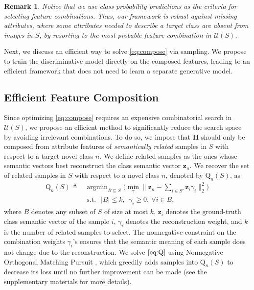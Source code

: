 \documentclass[10pt,journal,compsoc]{IEEEtran}
\newcommand{\z}{\boldsymbol{z}}
\renewcommand{\H}{\boldsymbol{H}}
\newcommand{\1}{\boldsymbol{1}}
\newcommand{\0}{\boldsymbol{0}}
\newcommand{\U}{\mathcal{U}}
\newcommand{\Q}{\mathrm{Q}}
\newcommand{\argmin}{\operatorname{argmin}}
\newcommand{\<}{\langle}
\renewcommand{\>}{\rangle}
\newtheorem{remark}{Remark}
\begin{document}
\begin{remark}
Notice that we use class probability predictions as the criteria for selecting feature combinations. Thus, our framework is robust against missing attributes, where some attributes needed to describe a target class are absent from images in $S$, by resorting to the most probable feature combination  in $\U(S)$.
\end{remark} 

Next, we discuss an efficient way to solve \eqref{eq:compose} via sampling. We propose to train the discriminative model directly on the composed features, leading to an efficient framework that does not need to learn a separate generative model.

\subsection{Efficient Feature Composition}
Since optimizing \eqref{eq:compose} requires an expensive combinatorial search in $\U(S)$, we propose an efficient method to significantly reduce the search space by avoiding irrelevant combinations. To do so, we impose that $\H$ should only be composed from attribute features of \emph{semantically related} samples in $S$ with respect to a target novel class $n$. We define related samples as the ones whose semantic vectors best reconstruct the class semantic vector $\z_n$. We recover the set of related samples in $S$ with respect to a novel class $n$, denoted by $\Q_{n}(S)$, as
\begin{equation}
\begin{split}
\label{eq:Q}
\Q_{n}(S)\triangleq &\argmin_{B\subseteq S} \Big(\min_{\gamma}\|\z_n-\sum_{i\in S'}\z_{i}\gamma_i\|^2_2\Big)\\
&\operatorname{s.t.}~~ |B|\leq k,~~ \gamma_i \geq 0,~ \forall i \in B,
\end{split}
\end{equation}
where $B$ denotes any subset of $S$ of size at most $k$, $\z_i$ denotes the ground-truth class semantic vector of the sample $i$, $\gamma_i$ denotes the reconstruction weight, and $k$ is the number of related samples to select. The nonnegative constraint on the combination weights $\gamma_i$'s ensures that the semantic meaning of each sample does not change due to the reconstruction.
We solve $\eqref{eq:Q}$ using Nonnegative Orthogonal Matching Pursuit \cite{Lin:ICML14}, which greedily adds samples into $\Q_{n}(S)$ to decrease its loss until no further improvement can be made (see the supplementary materials for more details). 
\end{document}
